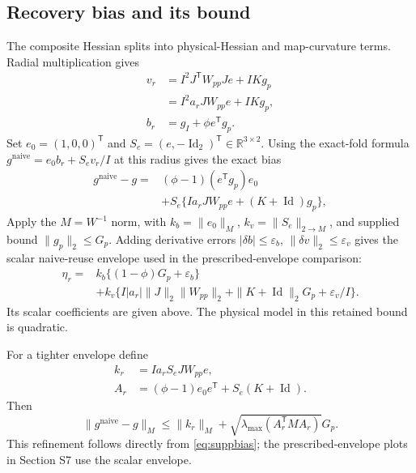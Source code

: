 \subsection{Recovery bias and its bound}
The composite Hessian splits into physical-Hessian and map-curvature terms. Radial multiplication gives
\begin{equation}
 \begin{aligned}
 v_r&=I^2J^{\mathsf T}W_{pp}Je+IKg_p\\
    &=I^2a_rJW_{pp}e+IKg_p,\\
 b_r&=g_I+\phi e^{\mathsf T}g_p.
 \end{aligned}
 \label{eq:suppnearhvp}
\end{equation}
Set $e_0=(1,0,0)^{\mathsf T}$ and $S_e=(e,-\operatorname{Id}_2)^{\mathsf T}\in\mathbb R^{3\times2}$. Using the exact-fold formula $g^{\mathrm{naive}}=e_0b_r+S_ev_r/I$ at this radius gives the exact bias
\begin{equation}
 \begin{aligned}
 g^{\mathrm{naive}}-g={}&(\phi-1)(e^{\mathsf T}g_p)e_0\\
 &+S_e\{Ia_rJW_{pp}e+(K+\operatorname{Id})g_p\},
 \end{aligned}
 \label{eq:suppbias}
\end{equation}
Apply the $M=W^{-1}$ norm, with $k_b=\|e_0\|_M$, $k_v=\|S_e\|_{2\to M}$, and supplied bound $\|g_p\|_2\leq G_p$. Adding derivative errors $|\delta b|\leq\varepsilon_b$, $\|\delta v\|_2\leq\varepsilon_v$ gives the scalar naive-reuse envelope used in the prescribed-envelope comparison:
\begin{equation}
 \begin{aligned}
 \eta_r={}&k_b\{(1-\phi)G_p+\varepsilon_b\}\\
 &+k_v\{I|a_r|\|J\|_2\|W_{pp}\|_2
       +\|K+\operatorname{Id}\|_2G_p+\varepsilon_v/I\}.
 \end{aligned}
 \label{eq:nearenvelope}
\end{equation}
Its scalar coefficients are given above. The physical model in this retained bound is quadratic.

For a tighter envelope define
\begin{equation}
 \begin{aligned}
 k_r&=Ia_rS_eJW_{pp}e,\\
 A_r&=(\phi-1)e_0e^{\mathsf T}+S_e(K+\operatorname{Id}).
 \end{aligned}
 \label{eq:suppoperator}
\end{equation}
Then
\begin{equation}
 \|g^{\mathrm{naive}}-g\|_M\leq
 \|k_r\|_M+\sqrt{\lambda_{\max}(A_r^{\mathsf T}MA_r)}G_p.
 \label{eq:supptightenvelope}
\end{equation}
This refinement follows directly from \eqref{eq:suppbias}; the prescribed-envelope plots in Section S7 use the scalar envelope.

